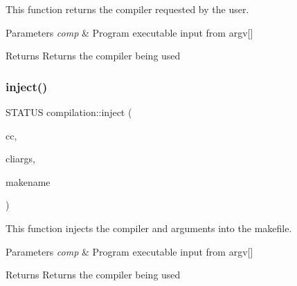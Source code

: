 This function returns the compiler requested by the user. 


\begin{DoxyParams}{Parameters}
{\em comp} & Program executable input from argv\mbox{[}\mbox{]}\\
\hline
\end{DoxyParams}
\begin{DoxyReturn}{Returns}
Returns the compiler being used 
\end{DoxyReturn}
\mbox{\label{namespacecompilation_a8903c2b63e13907904d398bca6d64d9f}} 
\subsubsection{\texorpdfstring{inject()}{inject()}}
{\footnotesize\ttfamily S\+T\+A\+T\+US compilation\+::inject (\begin{DoxyParamCaption}\item[{C\+O\+M\+P\+IL}]{cc,  }\item[{std\+::string}]{cliargs,  }\item[{std\+::string}]{makename }\end{DoxyParamCaption})}



This function injects the compiler and arguments into the makefile. 


\begin{DoxyParams}{Parameters}
{\em comp} & Program executable input from argv\mbox{[}\mbox{]}\\
\hline
\end{DoxyParams}
\begin{DoxyReturn}{Returns}
Returns the compiler being used 
\end{DoxyReturn}
